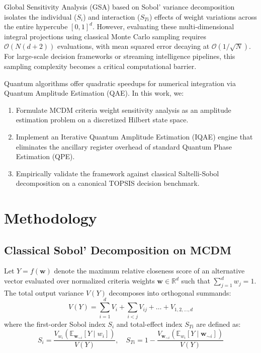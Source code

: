\documentclass[journal]{IEEEtran}
\begin{document}
Global Sensitivity Analysis (GSA) based on Sobol' variance decomposition isolates the individual ($S_i$) and interaction ($S_{Ti}$) effects of weight variations across the entire hypercube $[0, 1]^d$. However, evaluating these multi-dimensional integral projections using classical Monte Carlo sampling requires $\mathcal{O}(N(d+2))$ evaluations, with mean squared error decaying at $\mathcal{O}(1/\sqrt{N})$. For large-scale decision frameworks or streaming intelligence pipelines, this sampling complexity becomes a critical computational barrier.

Quantum algorithms offer quadratic speedups for numerical integration via Quantum Amplitude Estimation (QAE). In this work, we:
\begin{enumerate}
    \item Formulate MCDM criteria weight sensitivity analysis as an amplitude estimation problem on a discretized Hilbert state space.
    \item Implement an Iterative Quantum Amplitude Estimation (IQAE) engine that eliminates the ancillary register overhead of standard Quantum Phase Estimation (QPE).
    \item Empirically validate the framework against classical Saltelli-Sobol decomposition on a canonical TOPSIS decision benchmark.
\end{enumerate}

\section{Methodology}
\subsection{Classical Sobol' Decomposition on MCDM}
Let $Y = f(\mathbf{w})$ denote the maximum relative closeness score of an alternative vector evaluated over normalized criteria weights $\mathbf{w} \in \mathbb{R}^d$ such that $\sum_{j=1}^d w_j = 1$. The total output variance $V(Y)$ decomposes into orthogonal summands:
\begin{equation}
V(Y) = \sum_{i=1}^d V_i + \sum_{i < j} V_{ij} + \dots + V_{1, 2, \dots, d}
\end{equation}
where the first-order Sobol index $S_i$ and total-effect index $S_{Ti}$ are defined as:
\begin{equation}
S_i = \frac{V_{w_i}\left(\mathbb{E}_{\mathbf{w}_{\sim i}}[Y \mid w_i]\right)}{V(Y)}, \quad S_{Ti} = 1 - \frac{V_{\mathbf{w}_{\sim i}}\left(\mathbb{E}_{w_i}[Y \mid \mathbf{w}_{\sim i}]\right)}{V(Y)}
\end{equation}
\end{document}
